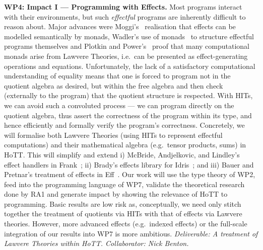 \documentclass[a4paper,11pt]{article}
\newcommand{\eg}{{e.g.}\ }
\begin{document}
{\bf WP4: Impact I --- Programming with Effects.}  Most programs
interact with their environments, but such \emph{effectful} programs
are inherently difficult to reason about.  Major advances
were Moggi's~\cite{moggi:monad} realisation that effects can be
modelled semantically by monads, Wadler's use of monads~\cite{wadler:monads} to structure
effectful programs themselves and Plotkin and
Power's~\cite{PlotkinPower:Lawvere} proof that many computational
monads arise from Lawvere Theories, i.e.\ can be presented as
effect-generating operations and equations.  Unfortunately, the lack
of a satisfactory computational understanding of equality means that
one is forced to program not in the quotient algebra as desired, but
within the free algebra and then check (externally to the program)
that the quotient structure is respected.  With HITs, we can avoid
such a convoluted process --- we can program directly on the quotient
algebra, thus assert the correctness of the program within its type, and
hence efficiently and formally verify the program's
correctness. Concretely, we will formalise both Lawvere Theories
(using HITs to represent effectful computations) and their
mathematical algebra (e.g.\ tensor products, sums) in HoTT.  This will
simplify and extend i) McBride, Andjelkovic, and Lindley's effect
handlers in Frank~\cite{conor:frank}; ii) Brady's effects library for
Idris~\cite{brady:effects}; and iii) Bauer and Pretnar's treatment of
 effects in Eff~\cite{bauer:eff}.  Our work will use the type theory of
WP2, feed into the programming language of WP7, validate the
theoretical research done by RA1 and generate impact by showing the
relevance of HoTT to programming. Basic results are low risk as,
conceptually, we need only stitch together the treatment of quotients
via HITs with that of effects via Lawvere theories.  However, more
advanced effects (\eg indexed effects) or the full-scale integration
of our results into WP7 is more ambitious. {\em Deliverable: A
treatment of Lawvere Theories within HoTT.  Collaborator: Nick
Benton.  }
\end{document}
